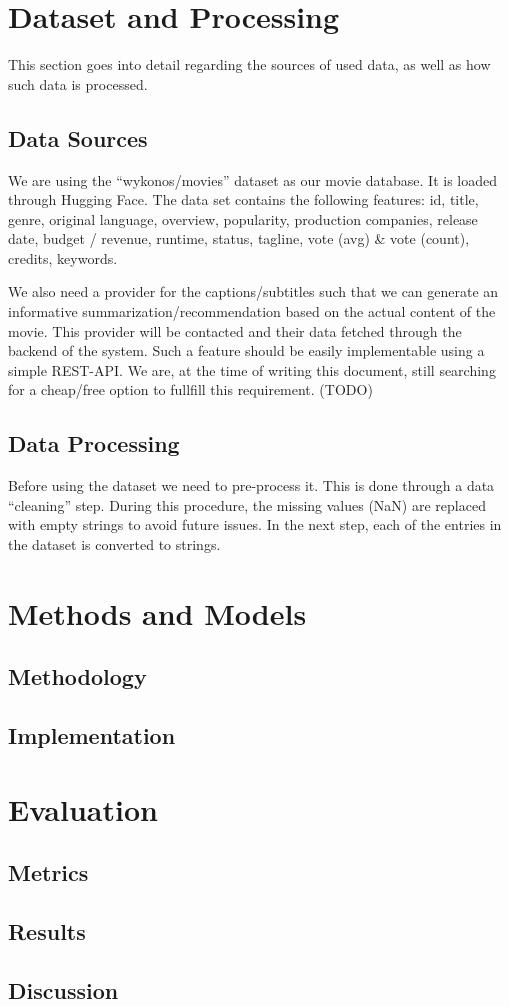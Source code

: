 \documentclass[12pt,a4paper]{article}
\begin{document}
  \section{Dataset and Processing}

  This section goes into detail regarding the sources of used data, as well as how such data is processed.

  \subsection{Data Sources}

  We are using the ``wykonos/movies'' dataset as our movie database.
  It is loaded through Hugging Face.
  The data set contains the following features:
  id, title, genre, original language, overview, popularity, production companies, release date, budget / revenue, runtime, status, tagline, vote (avg) \& vote (count), credits, keywords.

  We also need a provider for the captions/subtitles such that we can generate an informative summarization/recommendation based on the actual content of the movie.
  This provider will be contacted and their data fetched through the backend of the system.
  Such a feature should be easily implementable using a simple REST-API.
  We are, at the time of writing this document, still searching for a cheap/free option to fullfill this requirement. (TODO)

  \subsection{Data Processing}

  Before using the dataset we need to pre-process it.
  This is done through a data ``cleaning'' step.
  During this procedure, the missing values (NaN) are replaced with empty strings to avoid future issues.
  In the next step, each of the entries in the dataset is converted to strings.

  \section{Methods and Models}

  \subsection{Methodology}
  \subsection{Implementation}

  \section{Evaluation}
  \subsection{Metrics}

  \subsection{Results}

  \subsection{Discussion}
\end{document}
